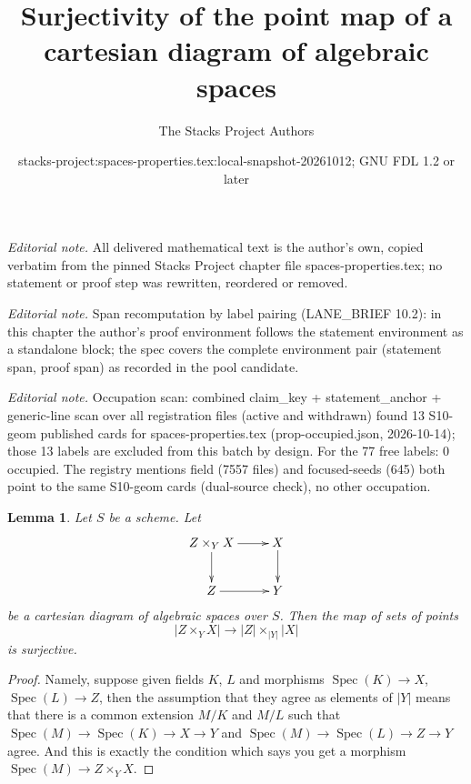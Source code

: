 \documentclass[10pt,a4paper]{amsart}
\title{Surjectivity of the point map of a cartesian diagram of algebraic spaces}
\author{The Stacks Project Authors}
\date{stacks-project:spaces-properties.tex:local-snapshot-20261012; GNU FDL 1.2 or later}
\theoremstyle{plain}
\newtheorem{lemma}[subsection]{Lemma}
\theoremstyle{definition}
\theoremstyle{remark}
\numberwithin{equation}{subsection}
\def\Spec{\mathop{\mathrm{Spec}}}
\begin{document}
\maketitle
\noindent\textit{Editorial note.} All delivered mathematical text is the author's own, copied verbatim from the pinned Stacks Project chapter file spaces-properties.tex; no statement or proof step was rewritten, reordered or removed.\par\medskip
\noindent\textit{Editorial note.} Span recomputation by label pairing (LANE\_BRIEF 10.2): in this chapter the author's proof environment follows the statement environment as a standalone block; the spec covers the complete environment pair (statement span, proof span) as recorded in the pool candidate.\par\medskip
\noindent\textit{Editorial note.} Occupation scan: combined claim\_key + statement\_anchor + generic-line scan over all registration files (active and withdrawn) found 13 S10-geom published cards for spaces-properties.tex (prop-occupied.json, 2026-10-14); those 13 labels are excluded from this batch by design. For the 77 free labels: 0 occupied. The registry mentions field (7557 files) and focused-seeds (645) both point to the same S10-geom cards (dual-source check), no other occupation.\par\medskip
\begin{lemma}
\label{lemma-points-cartesian}
Let $S$ be a scheme. Let
$$
\xymatrix{
Z \times_Y X \ar[r] \ar[d] & X \ar[d] \\
Z \ar[r] & Y
}
$$
be a cartesian diagram of algebraic spaces over $S$. Then the map of sets
of points
$$
|Z \times_Y X|
\longrightarrow
|Z| \times_{|Y|} |X|
$$
is surjective.
\end{lemma}

\begin{proof}
Namely, suppose given fields $K$, $L$ and morphisms
$\Spec(K) \to X$, $\Spec(L) \to Z$, then the
assumption that they agree as elements of $|Y|$ means that
there is a common extension $M/K$ and $M/L$
such that
$\Spec(M) \to \Spec(K) \to X \to Y$ and
$\Spec(M) \to \Spec(L) \to Z \to Y$ agree.
And this is exactly the condition which says you get a
morphism $\Spec(M) \to Z \times_Y X$.
\end{proof}
\end{document}
